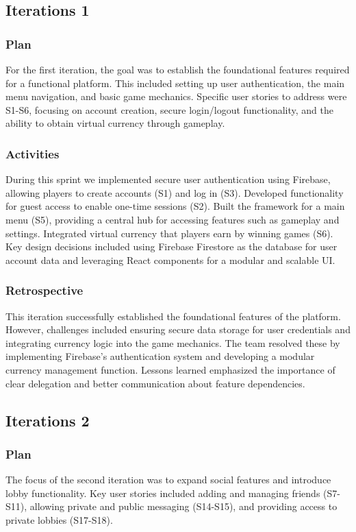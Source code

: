 \subsection{Iterations 1}

\subsubsection{Plan}
For the first iteration, the goal was to establish the foundational features required for a functional platform. This included setting up user authentication, the main menu navigation, and basic game mechanics. Specific user stories to address were S1-S6, focusing on account creation, secure login/logout functionality, and the ability to obtain virtual currency through gameplay.

\subsubsection{Activities}
During this sprint we implemented secure user authentication using Firebase, allowing players to create accounts (S1) and log in (S3). Developed functionality for guest access to enable one-time sessions (S2). Built the framework for a main menu (S5), providing a central hub for accessing features such as gameplay and settings. Integrated virtual currency that players earn by winning games (S6). Key design decisions included using Firebase Firestore as the database for user account data and leveraging React components for a modular and scalable UI.

\subsubsection{Retrospective}
This iteration successfully established the foundational features of the platform. However, challenges included ensuring secure data storage for user credentials and integrating currency logic into the game mechanics. The team resolved these by implementing Firebase's authentication system and developing a modular currency management function. Lessons learned emphasized the importance of clear delegation and better communication about feature dependencies.

\subsection{Iterations 2}

\subsubsection{Plan}
The focus of the second iteration was to expand social features and introduce lobby functionality. Key user stories included adding and managing friends (S7-S11), allowing private and public messaging (S14-S15), and providing access to private lobbies (S17-S18).

